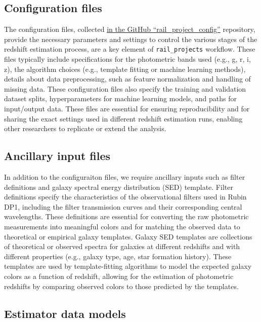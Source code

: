 \subsection{Configuration files}
\label{sec: products:configuration}

The configuration files, collected \href{https://github.com/lsstdesc/rail_project_config}{in the GitHub ``rail\_project\_config''} repository, provide the necessary parameters and settings to control the various stages of the redshift estimation process, are a key element of \texttt{rail\_projects} workflow.  These files typically include specifications for the photometric bands used (e.g., g, r, i, z), the algorithm choices (e.g., template fitting or machine learning methods), details about data preprocessing, such as feature normalization and handling of missing data.  These configuration files also specify the training and validation dataset splits, hyperparameters for machine learning models, and paths for input/output data.  These files are essential for ensuring reproducibility and for sharing the exact settings used in different redshift estimation runs, enabling other researchers to replicate or extend the analysis. 

\subsection{Ancillary input files}
\label{sec: products:algo_files}

In addition to the configuraiton files, we require ancillary inputs such as filter definitions and galaxy spectral energy distribution (SED) template.  Filter definitions specify the characteristics of the observational filters used in Rubin DP1, including the filter transmission curves and their corresponding central wavelengths.  These definitions are essential for converting the raw photometric measurements into meaningful colors and for matching the observed data to theoretical or empirical galaxy templates.  Galaxy SED templates are collections of theoretical or observed spectra for galaxies at different redshifts and with different properties (e.g., galaxy type, age, star formation history).  These templates are used by template-fitting algorithms to model the expected galaxy colors as a function of redshift, allowing for the estimation of photometric redshifts by comparing observed colors to those predicted by the templates.   


\subsection{Estimator data models}
\label{sec: products:models}

